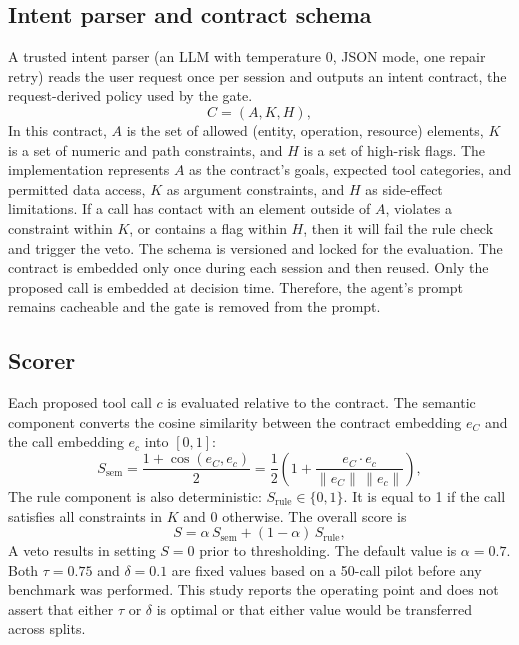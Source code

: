 \documentclass[a4paper,conference]{IEEEtran}
\begin{document}
\subsection{Intent parser and contract schema}
A trusted intent parser (an LLM with temperature 0, JSON mode, one repair retry) reads the user request once per session and outputs an intent contract, the request-derived policy used by the gate.
\begin{equation}
  C = (A, K, H), \label{eq:contract}
\end{equation}
In this contract, $A$ is the set of allowed (entity, operation, resource) elements, $K$ is a set of numeric and path constraints, and $H$ is a set of high-risk flags. The implementation represents $A$ as the contract's goals, expected tool categories, and permitted data access, $K$ as argument constraints, and $H$ as side-effect limitations. If a call has contact with an element outside of $A$, violates a constraint within $K$, or contains a flag within $H$, then it will fail the rule check and trigger the veto. The schema is versioned and locked for the evaluation. The contract is embedded only once during each session and then reused. Only the proposed call is embedded at decision time. Therefore, the agent's prompt remains cacheable and the gate is removed from the prompt.

\subsection{Scorer}
Each proposed tool call $c$ is evaluated relative to the contract. The semantic component converts the cosine similarity between the contract embedding $e_C$ and the call embedding $e_c$ into $[0,1]$:
\begin{equation}
  S_{\mathrm{sem}} = \frac{1 + \cos(e_C, e_c)}{2} = \frac{1}{2}\left(1+\frac{e_C \cdot e_c}{\lVert e_C \rVert \, \lVert e_c \rVert}\right), \label{eq:sem}
\end{equation}
The rule component is also deterministic: $S_{\mathrm{rule}} \in \{0,1\}$. It is equal to 1 if the call satisfies all constraints in $K$ and 0 otherwise. The overall score is
\begin{equation}
  S = \alpha \, S_{\mathrm{sem}} + (1 - \alpha) \, S_{\mathrm{rule}}, \label{eq:score}
\end{equation}
A veto results in setting $S=0$ prior to thresholding. The default value is $\alpha=0.7$. Both $\tau=0.75$ and $\delta=0.1$ are fixed values based on a 50-call pilot before any benchmark was performed. This study reports the operating point and does not assert that either $\tau$ or $\delta$ is optimal or that either value would be transferred across splits.
\end{document}
